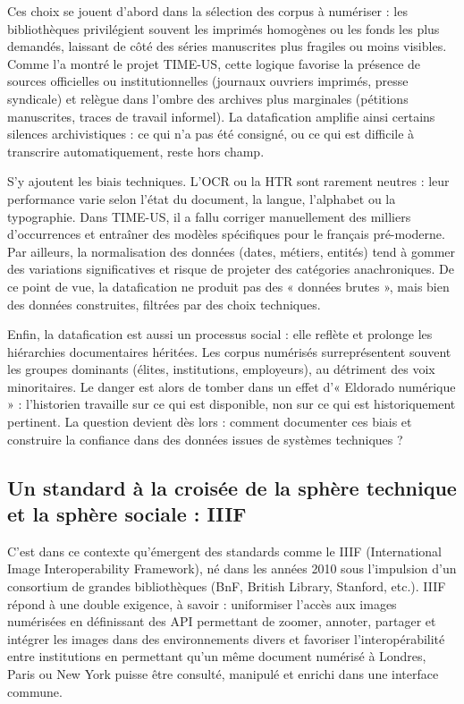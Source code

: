 Ces choix se jouent d’abord dans la sélection des corpus à numériser : les bibliothèques privilégient souvent les imprimés homogènes ou les fonds les plus demandés, laissant de côté des séries manuscrites plus fragiles ou moins visibles. Comme l’a montré le projet TIME-US, cette logique favorise la présence de sources officielles ou institutionnelles (journaux ouvriers imprimés, presse syndicale) et relègue dans l’ombre des archives plus marginales (pétitions manuscrites, traces de travail informel). La datafication amplifie ainsi certains silences archivistiques : ce qui n’a pas été consigné, ou ce qui est difficile à transcrire automatiquement, reste hors champ.

S’y ajoutent les biais techniques. L’OCR ou la HTR sont rarement neutres : leur performance varie selon l’état du document, la langue, l’alphabet ou la typographie. Dans TIME-US, il a fallu corriger manuellement des milliers d’occurrences et entraîner des modèles spécifiques pour le français pré-moderne. Par ailleurs, la normalisation des données (dates, métiers, entités) tend à gommer des variations significatives et risque de projeter des catégories anachroniques. De ce point de vue, la datafication ne produit pas des « données brutes », mais bien des données construites, filtrées par des choix techniques.

Enfin, la datafication est aussi un processus social : elle reflète et prolonge les hiérarchies documentaires héritées. Les corpus numérisés surreprésentent souvent les groupes dominants (élites, institutions, employeurs), au détriment des voix minoritaires. Le danger est alors de tomber dans un effet d’« Eldorado numérique » : l’historien travaille sur ce qui est disponible, non sur ce qui est historiquement pertinent. La question devient dès lors : comment documenter ces biais et construire la confiance dans des données issues de systèmes techniques ?

\subsection{Un standard à la croisée de la sphère technique et la sphère sociale : IIIF}

C’est dans ce contexte qu’émergent des standards comme le IIIF (International Image Interoperability Framework), né dans les années 2010 sous l’impulsion d’un consortium de grandes bibliothèques (BnF, British Library, Stanford, etc.). IIIF répond à une double exigence, à savoir : uniformiser l’accès aux images numérisées en définissant des API permettant de zoomer, annoter, partager et intégrer les images dans des environnements divers et favoriser l’interopérabilité entre institutions en permettant qu’un même document numérisé à Londres, Paris ou New York puisse être consulté, manipulé et enrichi dans une interface commune.

